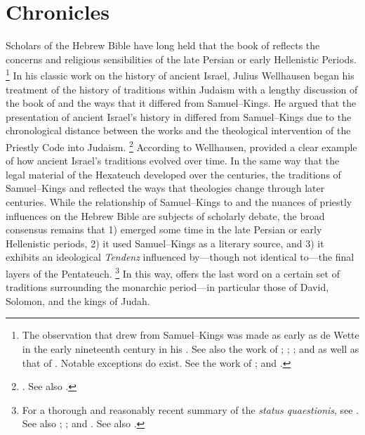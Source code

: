 
\chapter{Chronicles}
\label{chap:chronicles}

Scholars of the Hebrew Bible have long held that the book of \chronicles reflects the concerns and religious sensibilities of the late Persian or early Hellenistic Periods.%
    \footnote{The observation that \chronicles drew from Samuel--Kings was made as early as de Wette in the early nineteenth century in his \cite*{dewette1806}. See also the work of
        \cite{mckenzie1985};
        \cite{mckenzie_graham-mckenzie1999};
        \cite[66--71]{knoppers2003}; and
        \cite[30--42]{klein2006} as well as that of
        \cite[74]{carr2011}. Notable exceptions do exist. See the work of
        \cite{auld1994};
        \cite{auld_graham-mckenzie1999} and
        \cite{person2010}.}
In his classic work on the history of ancient Israel, Julius Wellhausen began his treatment of the history of traditions within Judaism with a lengthy discussion of the book of \chronicles and the ways that it differed from Samuel--Kings. He argued that the presentation of ancient Israel's history in \chronicles differed from Samuel--Kings due to the chronological distance between the works and the theological intervention of the Priestly Code into \secondtemple Judaism.%
    \footnote{%
        \cite[171--172]{wellhausen1957}. See also
        \cite{wright_ulrich-wright1992}.}
According to Wellhausen, \chronicles provided a clear example of how ancient Israel's traditions evolved over time. In the same way that the legal material of the Hexateuch developed over the centuries, the traditions of Samuel--Kings and \chronicles reflected the ways that  theologies change through later centuries. While the relationship of Samuel--Kings to \chronicles and the nuances of priestly influences on the Hebrew Bible are subjects of scholarly debate, the broad consensus remains that 1) \chronicles emerged some time in the late Persian or early Hellenistic periods, 2) it used Samuel--Kings as a literary source, and 3) it exhibits an ideological \emph{Tendenz} influenced by---though not identical to---the final layers of the Pentateuch.%
    \footnote{For a thorough and reasonably recent summary of the \emph{status quaestionis}, see
        \cite[72--89]{knoppers2003}. See also
        \cite{japhet1993};
        \cite{japhet2009};
        \cite{braun1986} and
        \cite{coggins1976}. See also
        \cite{person_ot2011}.}
In this way, \chronicles offers the last word on a certain set of traditions surrounding the monarchic period---in particular those of David, Solomon, and the kings of Judah.


